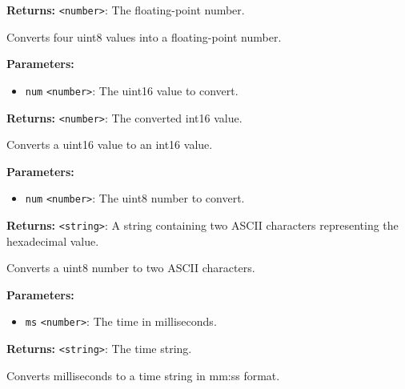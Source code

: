\documentclass[12pt,a4paper]{article}
\begin{document}
\noindent \textbf{Returns:} \texttt{<number>}: The floating-point number.

\noindent Converts four uint8 values into a floating-point number.

\vspace{5mm}
\noindent {}


\noindent \textbf{Parameters:}
\begin{itemize}
  \item \texttt{num} \texttt{<number>}: The uint16 value to convert.
\end{itemize}

\noindent \textbf{Returns:} \texttt{<number>}: The converted int16 value.

\noindent Converts a uint16 value to an int16 value.

\vspace{5mm}
\noindent {}


\noindent \textbf{Parameters:}
\begin{itemize}
  \item \texttt{num} \texttt{<number>}: The uint8 number to convert.
\end{itemize}

\noindent \textbf{Returns:} \texttt{<string>}: A string containing two ASCII characters representing the hexadecimal value.

\noindent Converts a uint8 number to two ASCII characters.

\vspace{5mm}
\noindent {}


\noindent \textbf{Parameters:}
\begin{itemize}
  \item \texttt{ms} \texttt{<number>}: The time in milliseconds.
\end{itemize}

\noindent \textbf{Returns:} \texttt{<string>}: The time string.

\noindent Converts milliseconds to a time string in mm:ss format.

\vspace{5mm}
\noindent {}
\end{document}
